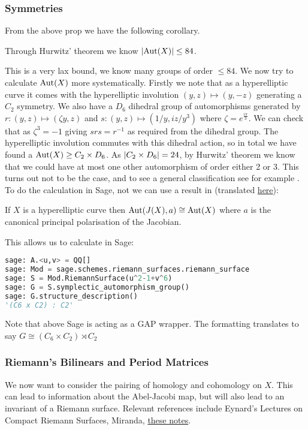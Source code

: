 \documentclass{article}
\begin{document}
\subsubsection{Symmetries}
From the above prop we have the following corollary.
\begin{corollary}
	Through Hurwitz' theorem we know $\left\lvert \operatorname{Aut}(X) \right\rvert \leq 84$.
\end{corollary}
This is a very lax bound, we know many groups of order $\leq 84$. We now try to calculate $\operatorname{Aut}(X)$ more systematically. Firstly we note that as a hyperelliptic curve it comes with the hyperelliptic involution $(y,z) \mapsto(y,-z)$ generating a $C_2$ symmetry. We also have a $D_6$ dihedral group of automorphisms generated by $r:(y,z) \mapsto (\zeta y, z)$ and $s:(y,z) \mapsto (1/y,iz/y^3)$ where $\zeta = e^{\frac{i\pi}{3}}$. We can check that as $\zeta^3=-1$ 
giving $srs=r^{-1}$ as required from the dihedral group. The hyperelliptic involution commutes with this dihedral action, so in total we have found a $\operatorname{Aut}(X) \geq C_2 \times D_6$. As $\left\lvert C_2 \times D_6 \right\rvert=24$, by Hurwitz' theorem we know that we could have at most one other automorphism of order either 2 or 3. This turns out not to be the case, and to see a general classification see for example \cite{Muller2017}. \\
To do the calculation in Sage, not we can use a result in \cite{Lauter2001} (translated \href{https://www.arxiv-vanity.com/papers/1811.07007/}{here}):
\begin{lemma}
	If $X$ is a hyperelliptic curve then $\operatorname{Aut}(J(X),a) \cong \operatorname{Aut}(X)$ where $a$ is the canonical principal polarisation of the Jacobian. 
\end{lemma}
This allows us to calculate in Sage:
\begin{lstlisting}[language=Python,frame=single]
sage: A.<u,v> = QQ[]
sage: Mod = sage.schemes.riemann_surfaces.riemann_surface
sage: S = Mod.RiemannSurface(u^2-1+v^6)
sage: G = S.symplectic_automorphism_group()
sage: G.structure_description()
'(C6 x C2) : C2'
\end{lstlisting}
\begin{remark}
	Note that above Sage is acting as a GAP wrapper. The formatting translates to say $G \cong (C_6 \times C_2) \rtimes C_2$
\end{remark}

\subsubsection{Riemann's Bilinears and Period Matrices}
We now want to consider the pairing of homology and cohomology on $X$. This can lead to information about the Abel-Jacobi map, but will also lead to an invariant of a Riemann surface. Relevant references include Eynard's Lectures on Compact Riemann Surfaces, Miranda, \href{https://people.reed.edu/~jerry/311/theta.pdf}{these notes}. 
\end{document}
